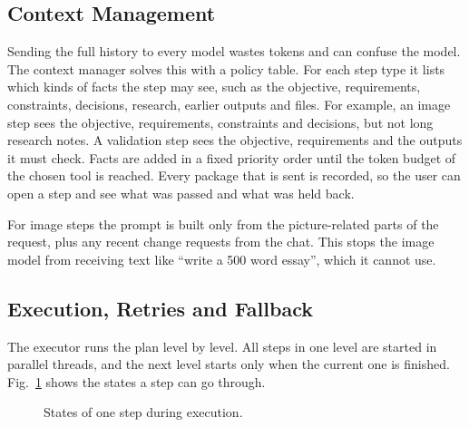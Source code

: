 \documentclass[conference]{IEEEtran}
\begin{document}
\subsection{Context Management}
Sending the full history to every model wastes tokens and can confuse the model. The context manager
solves this with a policy table. For each step type it lists which kinds of facts the step may see, such
as the objective, requirements, constraints, decisions, research, earlier outputs and files. For example,
an image step sees the objective, requirements, constraints and decisions, but not long research notes.
A validation step sees the objective, requirements and the outputs it must check. Facts are added in a
fixed priority order until the token budget of the chosen tool is reached. Every package that is sent is
recorded, so the user can open a step and see what was passed and what was held back.

For image steps the prompt is built only from the picture-related parts of the request, plus any recent
change requests from the chat. This stops the image model from receiving text like ``write a 500 word
essay'', which it cannot use.

\subsection{Execution, Retries and Fallback}
The executor runs the plan level by level. All steps in one level are started in parallel threads, and
the next level starts only when the current one is finished. Fig.~\ref{fig:state} shows the states a
step can go through.

\begin{figure}[!t]
\centering
{}
\caption{States of one step during execution.}
\label{fig:state}
\end{figure}
\end{document}
